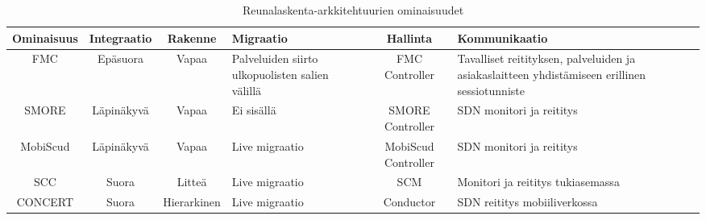\begin{landscape}
    \noindent
\begin{table}[!ht]
\caption{Reunalaskenta-arkkitehtuurien ominaisuudet}
\label{table:features}
\begin{tabularx}{\linewidth}{|c|c|c|p{3cm}|c|p{5cm}|}
\hline 
 \textbf{Ominaisuus} & \textbf{Integraatio} & \textbf{Rakenne} & \textbf{Migraatio} & \textbf{Hallinta} & \textbf{Kommunikaatio} \\ 
\hline 
 FMC & Epäsuora & Vapaa & Palveluiden siirto ulkopuolisten salien välillä
  & FMC Controller & Tavalliset reitityksen, palveluiden ja asiakaslaitteen yhdistämiseen erillinen sessiotunniste \\ 
\hline 
 SMORE & Läpinäkyvä & Vapaa & Ei sisällä & SMORE Controller & SDN monitori ja reititys \\ 
\hline 
MobiScud & Läpinäkyvä & Vapaa & Live migraatio & MobiScud Controller & SDN monitori ja reititys\\ 
\hline 
SCC & Suora & Litteä & Live migraatio & SCM & Monitori ja reititys tukiasemassa \\ 
\hline 
CONCERT & Suora & Hierarkinen & Live migraatio & Conductor & SDN reititys mobiiliverkossa \\ 
\hline 
\end{tabularx} 
\end{table}
\end{landscape}
\begin{table}
	
	
\end{table}
 